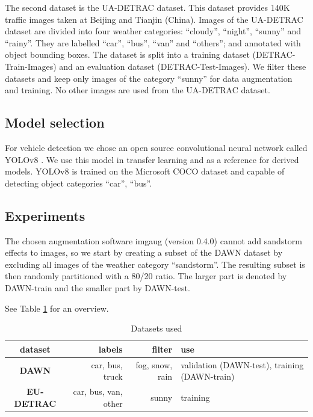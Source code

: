 \documentclass[]{article}
\begin{document}
	The second dataset is the UA-DETRAC \cite{CVIU_UA-DETRAC} dataset. This dataset provides 140K traffic images taken at Beijing and Tianjin (China). Images of the UA-DETRAC dataset are divided into four weather categories: ``cloudy'', ``night'', ``sunny'' and ``rainy''. They are labelled ``car'', ``bus'', ``van'' and ``others''; and annotated with object bounding boxes. The dataset is split into a training dataset (DETRAC-Train-Images) and an evaluation dataset (DETRAC-Test-Images).   We filter these datasets and keep only images of the category ``sunny'' for data augmentation and training. No other images are used from the UA-DETRAC dataset.

\subsection{Model selection}
 
	For vehicle detection we chose an open source convolutional neural network called YOLO{\small v8} \cite{yolov8_ultralytics}. We use this model in transfer learning and as a reference for derived models. YOLO{\small v8} is trained on the Microsoft COCO dataset \cite{linMicrosoftCOCOCommon2015a} and capable of detecting object categories ``car'', ``bus''.

\subsection{Experiments}

	The chosen augmentation software imgaug \cite{imgaug} (version 0.4.0) cannot add sandstorm effects to images, so we start by creating a subset of the DAWN dataset by excluding all images of the weather category ``sandstorm''. The resulting subset is then randomly partitioned with a 80/20 ratio. The larger part is denoted by DAWN-train and the smaller part by DAWN-test.

	See Table \ref{table:datasets} for an overview.

	\begin{table}
		\centering
		\begin{tabular}{crrp{1.5in}}
			\toprule
			\textbf{dataset} & \textbf{labels} & \textbf{filter} & \textbf{use} \\
			\midrule
			\textbf{DAWN} & car, bus, truck & fog, snow, rain & validation (DAWN-test), training (DAWN-train) \\
			\textbf{EU-DETRAC} & car, bus, van, other & sunny & training \\
			\bottomrule
		\end{tabular}
		\caption{Datasets used}
		\label{table:datasets}
	\end{table}
\end{document}
